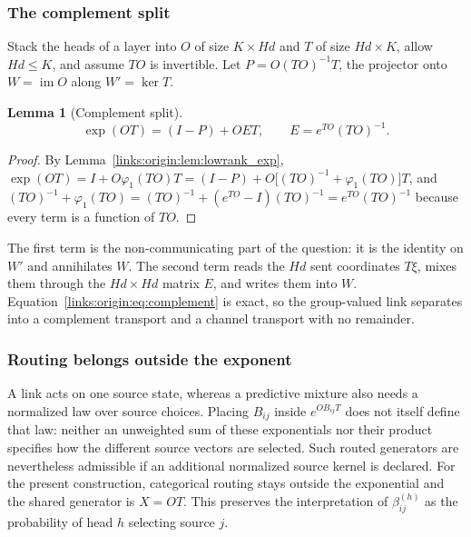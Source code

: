 \documentclass[11pt]{article}
\newtheorem{lemma}[theorem]{Lemma}
\theoremstyle{definition}
\theoremstyle{remark}
\providecommand{\im}{\operatorname{im}}
\begin{document}
\subsubsection{The complement split}

Stack the heads of a layer into $O$ of size $K\times Hd$ and $T$ of size $Hd\times K$, allow $Hd\le K$, and assume $TO$ is invertible. Let $P=O(TO)^{-1}T$, the projector onto $W=\im O$ along $W'=\ker T$.

\begin{lemma}[Complement split]
\label{links:origin:lem:complement}
\begin{equation}
\exp(OT)=(I-P)+OET,\qquad E=e^{TO}(TO)^{-1}.
\label{links:origin:eq:complement}
\end{equation}
\end{lemma}

\begin{proof}
By Lemma~\ref{links:origin:lem:lowrank_exp}, $\exp(OT)=I+O\varphi_1(TO)T=(I-P)+O\big[(TO)^{-1}+\varphi_1(TO)\big]T$, and $(TO)^{-1}+\varphi_1(TO)=(TO)^{-1}+(e^{TO}-I)(TO)^{-1}=e^{TO}(TO)^{-1}$ because every term is a function of $TO$.
\end{proof}

The first term is the non-communicating part of the question: it is the identity on $W'$ and annihilates $W$. The second term reads the $Hd$ sent coordinates $T\xi$, mixes them through the $Hd\times Hd$ matrix $E$, and writes them into $W$. Equation~\eqref{links:origin:eq:complement} is exact, so the group-valued link separates into a complement transport and a channel transport with no remainder.

\subsubsection{Routing belongs outside the exponent}

A link acts on one source state, whereas a predictive mixture also needs a normalized law over source choices. Placing $B_{ij}$ inside $e^{OB_{ij}T}$ does not itself define that law: neither an unweighted sum of these exponentials nor their product specifies how the different source vectors are selected. Such routed generators are nevertheless admissible if an additional normalized source kernel is declared. For the present construction, categorical routing stays outside the exponential and the shared generator is $X=OT$. This preserves the interpretation of $\beta_{ij}^{(h)}$ as the probability of head $h$ selecting source $j$.
\end{document}
